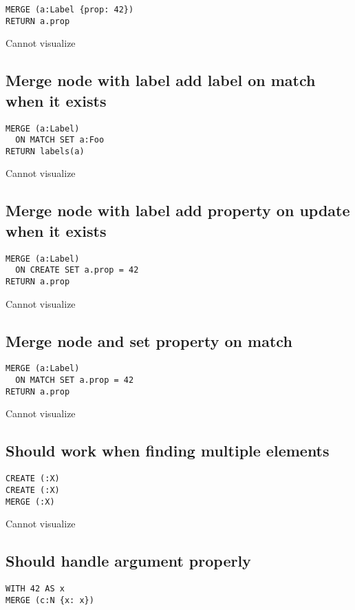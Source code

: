 \begin{lstlisting}
MERGE (a:Label {prop: 42})
RETURN a.prop
\end{lstlisting}

Cannot visualize
\subsection{Merge node with label add label on match when it exists}

\begin{lstlisting}
MERGE (a:Label)
  ON MATCH SET a:Foo
RETURN labels(a)
\end{lstlisting}

Cannot visualize
\subsection{Merge node with label add property on update when it exists}

\begin{lstlisting}
MERGE (a:Label)
  ON CREATE SET a.prop = 42
RETURN a.prop
\end{lstlisting}

Cannot visualize
\subsection{Merge node and set property on match}

\begin{lstlisting}
MERGE (a:Label)
  ON MATCH SET a.prop = 42
RETURN a.prop
\end{lstlisting}

Cannot visualize
\subsection{Should work when finding multiple elements}

\begin{lstlisting}
CREATE (:X)
CREATE (:X)
MERGE (:X)
\end{lstlisting}

Cannot visualize
\subsection{Should handle argument properly}

\begin{lstlisting}
WITH 42 AS x
MERGE (c:N {x: x})
\end{lstlisting}

